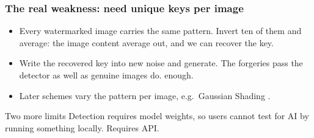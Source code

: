 \begin{frame}
\frametitle{The real weakness: need unique keys per image}
\begin{itemize}
    \item Every watermarked image carries the same pattern. Invert ten of them
    and average: the image content average out, and we can recover the key.
    \item Write the recovered key into new noise and generate. The forgeries
    pass the detector as well as genuine images do.
    enough.
    \item Later schemes vary the pattern per image, e.g.\ Gaussian Shading
    \parencite{yang2024gaussian}.
\end{itemize}
\vspace{0.2cm}
\begin{block}{Two more limits}
Detection requires model weights, so users cannot test for AI by running something
locally. Requires API.
\end{block}
\end{frame}
